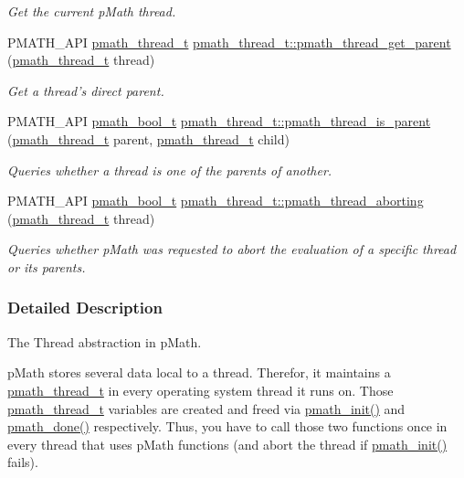 \begin{CompactItemize}
\begin{CompactList}\small\item\em Get the current pMath thread. \item\end{CompactList}\item 
PMATH\_\-API \hyperlink{classpmath__thread__t}{pmath\_\-thread\_\-t} \hyperlink{group__threads_gb0e137fb921f9b329a8a9e7c4efa3b3d}{pmath\_\-thread\_\-t::pmath\_\-thread\_\-get\_\-parent} (\hyperlink{classpmath__thread__t}{pmath\_\-thread\_\-t} thread)
\begin{CompactList}\small\item\em Get a thread's direct parent. \item\end{CompactList}\item 
PMATH\_\-API \hyperlink{group__general__types_gc92090cb0b56345d6c379ed2341d4ef4}{pmath\_\-bool\_\-t} \hyperlink{group__threads_g4409c7f042a1809eee72329002635fb9}{pmath\_\-thread\_\-t::pmath\_\-thread\_\-is\_\-parent} (\hyperlink{classpmath__thread__t}{pmath\_\-thread\_\-t} parent, \hyperlink{classpmath__thread__t}{pmath\_\-thread\_\-t} child)
\begin{CompactList}\small\item\em Queries whether a thread is one of the parents of another. \item\end{CompactList}\item 
PMATH\_\-API \hyperlink{group__general__types_gc92090cb0b56345d6c379ed2341d4ef4}{pmath\_\-bool\_\-t} \hyperlink{group__threads_g3932a5c364197c999dfab0aeb28e8779}{pmath\_\-thread\_\-t::pmath\_\-thread\_\-aborting} (\hyperlink{classpmath__thread__t}{pmath\_\-thread\_\-t} thread)
\begin{CompactList}\small\item\em Queries whether pMath was requested to abort the evaluation of a specific thread or its parents. \item\end{CompactList}\end{CompactItemize}


\subsubsection{Detailed Description}
The Thread abstraction in pMath. 

pMath stores several data local to a thread. Therefor, it maintains a \hyperlink{classpmath__thread__t}{pmath\_\-thread\_\-t} in every operating system thread it runs on. Those \hyperlink{classpmath__thread__t}{pmath\_\-thread\_\-t} variables are created and freed via \hyperlink{group__frontend_gfb9f2c789bee5295c6794d16c0164943}{pmath\_\-init()} and \hyperlink{group__frontend_g012705e1fd248a7cebf738bae6375dd9}{pmath\_\-done()} respectively. Thus, you have to call those two functions once in every thread that uses pMath functions (and abort the thread if \hyperlink{group__frontend_gfb9f2c789bee5295c6794d16c0164943}{pmath\_\-init()} fails).

